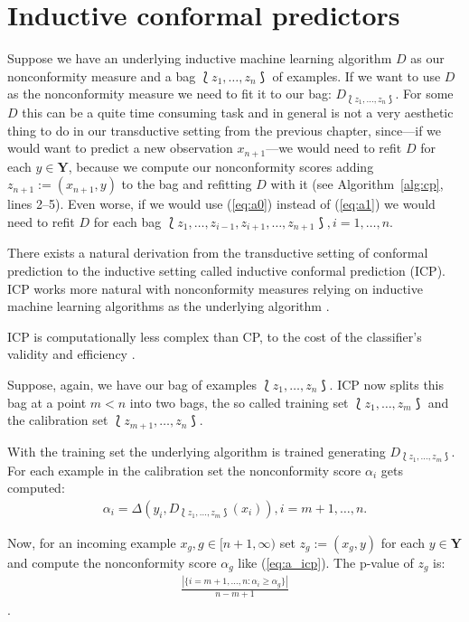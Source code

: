 \documentclass[twoside,11pt]{article}
\begin{document}
\section{Inductive conformal predictors}
\label{sec:icp}

Suppose we have an underlying inductive machine learning
algorithm $D$ as our nonconformity measure and a bag
$\Lbag z_1,\dots,z_n \Rbag$ of examples. If we want to use
$D$ as the nonconformity measure we need to fit it to our
bag: $D_{\Lbag z_1,\dots,z_n \Rbag}$. For some $D$ this can
be a quite time consuming task and in general is not a very
aesthetic thing to do in our transductive setting from the
previous chapter, since---if we would want to predict a
new observation $x_{n+1}$---we would need to refit $D$ for
each $y \in \textbf{Y}$, because we compute our
nonconformity scores adding $z_{n+1} := (x_{n+1},y)$ to
the bag and refitting $D$ with it
(see Algorithm~\ref{alg:cp}, lines 2--5).
Even worse, if we would use (\ref{eq:a0}) instead of
(\ref{eq:a1}) we would need to refit $D$ for each bag
$\Lbag z_1,\dots,z_{i-1},z_{i+1},\dots,z_{n+1} \Rbag,
i=1,\dots,n$.

There exists a natural derivation from the transductive
setting of conformal prediction to the inductive setting
called inductive conformal prediction (ICP).
ICP works more natural with nonconformity measures relying
on inductive machine learning algorithms as the underlying
algorithm \citep[see][Chapter 4]{alrw}.

ICP is computationally less complex than CP, to the cost of
the classifier's validity and efficiency
\citep[see][Chapter 4]{alrw}.

Suppose, again, we have our bag of examples
$\Lbag z_1,\dots,z_n \Rbag$. ICP now splits this bag at a
point $m < n$ into two bags, the so called training set
$\Lbag z_1,\dots,z_m \Rbag$ and the calibration set
$\Lbag z_{m+1},\dots,z_n \Rbag$.

With the training set the underlying algorithm is trained
generating $D_{\Lbag z_1,\dots,z_m \Rbag}$. For each
example in the calibration set the nonconformity score
$\alpha_i$ gets computed:
\begin{align}
  \label{eq:a_icp}
  \alpha_i=\Delta(y_i,D_{\Lbag z_1,\dots,z_m \Rbag}(x_i)),
  i=m+1,\dots,n.
\end{align}

Now, for an incoming example $x_g, g \in [n+1,\infty)$ set
$z_{g} := (x_g, y)$ for each $y \in \textbf{Y}$ and compute
the nonconformity score $\alpha_g$ like (\ref{eq:a_icp}).
The p-value of $z_{g}$ is:
\begin{align*}
  \frac{|\{i = m+1,\dots,n: \alpha_i \geq \alpha_g\}|}
       {n-m+1}
\end{align*}
\citep[see][]{papadopoulos_et_al_2007}.
\end{document}
